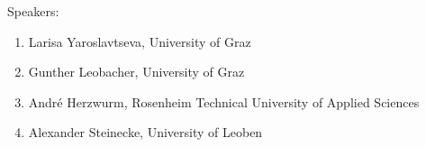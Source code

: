 \begin{talk}
Speakers:





\begin{enumerate}


\item Larisa Yaroslavtseva, University of Graz


\item Gunther Leobacher, University of Graz


\item Andr\'e Herzwurm, Rosenheim Technical University of Applied Sciences


\item Alexander Steinecke, University of Leoben


 


\end{enumerate}








\end{talk}

